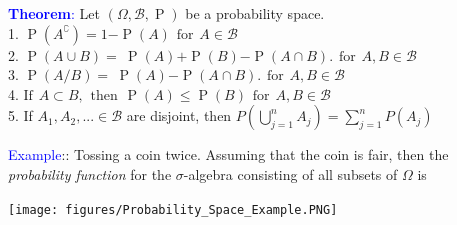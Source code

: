 \documentclass[letterpaper, 10.5pt,landscape]{article}
\begin{document}
\begin{multicols*}{3}
\textcolor{blue}{\textbf{Theorem}:} Let \((\Omega,\mathcal{B}, \mathrel{P})\) be a probability space. \\
1. \(\mathrel{P}(A^{\complement}) = 1 - \mathrel{P}(A) \hspace{5pt} \text{for} \hspace{5pt} A \in \mathcal{B}\)\\
2. \(\mathrel{P}(A \cup B)  =  \hspace{3pt} \mathrel{P}(A) + \mathrel{P}(B) - \mathrel{P}(A \cap B). \hspace{5pt} \text{for} \hspace{5pt} A, B \in \mathcal{B}\)\\
3. \( \mathrel{P}(A/B) = \hspace{3pt} \mathrel{P}(A) - \mathrel{P}(A \cap B). \hspace{5pt} \text{for} \hspace{5pt} A, B \in \mathcal{B}\)\\
4. \(\text{If} \hspace{5pt} A \subset B, \hspace{5pt} \text{then} \hspace{5pt} \mathrel{P}(A) \leq \mathrel{P}(B) \hspace{5pt} \text{for} \hspace{5pt} A,B \in \mathcal{B}\)\\
5.  If \( A_{1}, A_{2}, ... \in \mathcal{B} \) are disjoint, then  
\(\boxed{P \left( \bigcup \limits_{j=1}^{n} A_{j} \right) = \sum \limits_{j=1}^{n} P(A_{j})}\)


\vspace{3pt}
\textcolor{blue}{Example}:: Tossing a coin twice. Assuming that the coin is fair, then the \textit{probability function} for the $\sigma$-algebra consisting of all subsets of $\Omega$ is 

\begin{minipage}{0.8\linewidth}
    \centering
    \texttt{[image: figures/Probability\_Space\_Example.PNG]}
\end{minipage}


\end{multicols*}
\end{document}
